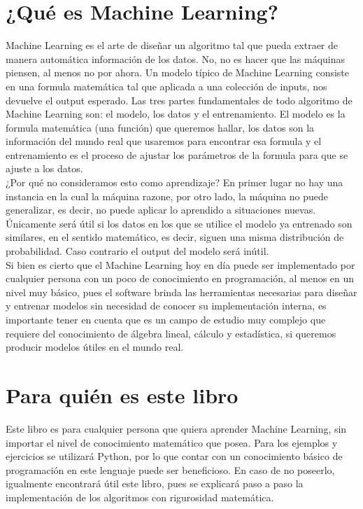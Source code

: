 \section{¿Qué es Machine Learning?}

Machine Learning es el arte de diseñar un algoritmo tal que
pueda extraer de manera automática información de los datos. 
No, no es hacer que las máquinas piensen, al menos no por ahora. Un modelo típico de Machine Learning consiste en una formula matemática
tal que aplicada a una colección de inputs, nos devuelve el output esperado.
Las tres partes fundamentales de todo algoritmo de Machine Learning son: el modelo, los datos y el entrenamiento.
El modelo es la formula matemática (una función) que queremos hallar, los datos son la información del mundo real que usaremos para encontrar esa formula 
y el entrenamiento es el proceso de ajustar los parámetros de la formula para que se ajuste a los datos.\\

¿Por qué no consideramos esto como aprendizaje? En primer lugar no hay una instancia en la cual la máquina razone, por otro lado, 
la máquina no puede generalizar, es decir, no puede aplicar lo aprendido a situaciones nuevas. Únicamente será útil si 
los datos en los que se utilice el modelo ya entrenado son similares, en el sentido matemático, es decir, siguen una misma distribución
de probabilidad. Caso contrario el output del modelo será inútil.\\ 

Si bien es cierto que el Machine Learning hoy en día 
puede ser implementado por cualquier persona con un poco de conocimiento en programación,
al menos en un nivel muy básico, pues el software brinda las herramientas necesarias para diseñar
y entrenar modelos sin necesidad de conocer su implementación interna,
es importante tener en cuenta que es un campo de estudio muy complejo 
que requiere del conocimiento de álgebra lineal, cálculo y estadística, si queremos producir modelos útiles en el mundo real.

\section{Para quién es este libro}

Este libro es para cualquier persona que quiera aprender Machine Learning, sin importar el nivel de conocimiento matemático que posea.
Para los ejemplos y ejercicios se utilizará Python, por lo que contar con un conocimiento básico de programación en este lenguaje puede ser beneficioso.
En caso de no poseerlo, igualmente encontrará útil este libro, pues se explicará paso a paso la implementación de los algoritmos con rigurosidad matemática.

